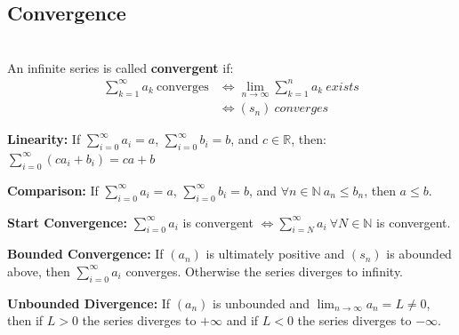 \documentclass[8pt,a4paper]{extarticle}     %
\theoremstyle{definition}
\theoremstyle{definition}
\theoremstyle{definition}
\newcommand{\R}{\mathbb{R}}
\newcommand{\N}{\mathbb{N}}
\begin{document}
\begin{multicols}{4}
\subsection{Convergence}
\begin{boxdefinition}[Convergence] \ \\ 
	An infinite series is called \textbf{convergent} if: 
	\[
	\begin{split}
		\sum_{k=1}^\infty a_k \ \text{converges} &\Leftrightarrow \lim_{n\to\infty}\sum_{k=1}^n a_k \ \textit{exists}\\
		&\Leftrightarrow (s_n) \ \textit{converges}
	\end{split}
	\]
\end{boxdefinition}
\begin{eqlist}
	\item \textbf{Linearity: } 
	If $\sum_{i=0}^\infty a_i=a$, $\sum_{i=0}^\infty b_i = b$, and $c\in\R$, then: $\sum_{i=0}^\infty (c a_i+b_i) = ca+b$
	\item \textbf{Comparison:} If $\sum_{i=0}^\infty a_i=a$, $\sum_{i=0}^\infty b_i = b$, and $\forall n\in\N \ a_n\leq b_n $, then $a\leq b$.
	\item \textbf{Start Convergence:} $\sum_{i=0}^\infty a_i$ is convergent $\Leftrightarrow \sum_{i=N}^\infty a_i \ \forall N\in\N$ is convergent. 
	\item \textbf{Bounded Convergence:} If $(a_n)$ is ultimately positive and $(s_n)$ is abounded above, then $\sum_{i=0}^\infty a_i$ converges. Otherwise the series diverges to infinity. 
	\item \textbf{Unbounded Divergence:} If $(a_n)$ is unbounded and $\lim_{n\to\infty} a_n=L\neq 0$, then if $L>0$ the series diverges to $+\infty$ and if $L<0$ the series diverges to $-\infty$.
\end{eqlist}


\end{multicols}
\end{document}

